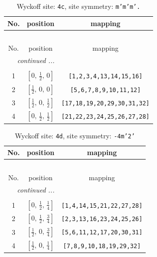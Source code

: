 \documentclass[fleqn,8pt]{jsarticle}
\begin{document}
\renewcommand{\arraystretch}{1.2}
\begin{longtable}{ccc}
\caption{Wyckoff site: {\tt 4c}, site symmetry: {\tt m'm'm'.}}
 \\
 \hline \hline
No. & position & mapping \\ \hline \endfirsthead

\multicolumn{2}{l}{\tablename\ \thetable{}} \\
 \hline \hline
No. & position & mapping \\ \hline \endhead

 \hline \hline
\multicolumn{2}{r}{\footnotesize\it continued ...} \\ \endfoot

 \hline \hline
\multicolumn{2}{r}{} \\ \endlastfoot

1 & $\left[ 0,\, \frac{1}{2},\, 0 \right]$ & {\tt [1,2,3,4,13,14,15,16]} \\ \hline
2 & $\left[ \frac{1}{2},\, 0,\, 0 \right]$ & {\tt [5,6,7,8,9,10,11,12]} \\ \hline
3 & $\left[ \frac{1}{2},\, 0,\, \frac{1}{2} \right]$ & {\tt [17,18,19,20,29,30,31,32]} \\ \hline
4 & $\left[ 0,\, \frac{1}{2},\, \frac{1}{2} \right]$ & {\tt [21,22,23,24,25,26,27,28]} \\
\end{longtable}
\renewcommand{\arraystretch}{1.2}
\begin{longtable}{ccc}
\caption{Wyckoff site: {\tt 4d}, site symmetry: {\tt -4m'2'}}
 \\
 \hline \hline
No. & position & mapping \\ \hline \endfirsthead

\multicolumn{2}{l}{\tablename\ \thetable{}} \\
 \hline \hline
No. & position & mapping \\ \hline \endhead

 \hline \hline
\multicolumn{2}{r}{\footnotesize\it continued ...} \\ \endfoot

 \hline \hline
\multicolumn{2}{r}{} \\ \endlastfoot

1 & $\left[ 0,\, \frac{1}{2},\, \frac{1}{4} \right]$ & {\tt [1,4,14,15,21,22,27,28]} \\ \hline
2 & $\left[ 0,\, \frac{1}{2},\, \frac{3}{4} \right]$ & {\tt [2,3,13,16,23,24,25,26]} \\ \hline
3 & $\left[ \frac{1}{2},\, 0,\, \frac{3}{4} \right]$ & {\tt [5,6,11,12,17,20,30,31]} \\ \hline
4 & $\left[ \frac{1}{2},\, 0,\, \frac{1}{4} \right]$ & {\tt [7,8,9,10,18,19,29,32]} \\
\end{longtable}
\end{document}
